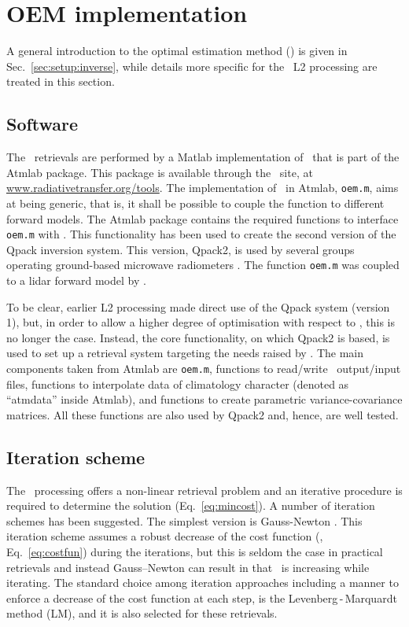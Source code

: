 \chapter{OEM implementation}
\label{chapter:oem}

A general introduction to the optimal estimation method (\OEM) is given in
Sec.~\ref{sec:setup:inverse}, while details more specific for the \smr\ L2
processing are treated in this section.


\section{Software}
\label{sec:oem.m}
%
The \smr\ retrievals are performed by a Matlab implementation of \OEM\ that is
part of the Atmlab package. This package is available through the \ARTS\ site,
at \url{www.radiativetransfer.org/tools}. The implementation of \OEM\ in Atmlab,
\texttt{oem.m}, aims at being generic, that is, it shall be possible to couple
the function to different forward models. The Atmlab package contains the
required functions to interface \texttt{oem.m} with \ARTS. This functionality
has been used to create the second version of the Qpack
\citep{eriksson:qpack:05} inversion system. This version, Qpack2, is used by
several groups operating ground-based microwave radiometers
\citep[e.g.][]{acp-15-5099-2015}. The function \texttt{oem.m} was coupled to a lidar
forward model by \citet{sica2015retrieval}.

To be clear, earlier L2 processing made direct use of the Qpack system (version
1), but, in order to allow a higher degree of optimisation
with respect to \smr, this is no longer the case.
Instead, the core functionality, on which Qpack2 is
based, is used to set up a retrieval system targeting the needs raised by \smr.
The main components taken from Atmlab are \texttt{oem.m}, functions to
read/write \ARTS\ output/input files, functions to interpolate data of
climatology character (denoted as ``atmdata'' inside Atmlab), and functions to
create parametric variance-covariance matrices. All these functions are also
used by Qpack2 and, hence, are well tested.


\section{Iteration scheme}
\label{sec:ml}
%
The \smr\ processing offers a non-linear retrieval problem and an iterative
procedure is required to determine the solution (Eq.~\ref{eq:mincost}). A
number of iteration schemes has been suggested. The simplest version is
Gauss-Newton \citep[see][Sec.~5.3]{rodgers:00}. This iteration scheme assumes a
robust decrease of the cost function (\CstFnc, Eq.~\ref{eq:costfun}) during the
iterations, but this is seldom the case in practical retrievals and instead
Gauss--Newton can result in that \CstFnc\ is increasing while iterating.
The standard choice among iteration approaches including a manner to enforce a
decrease of the cost function at each step, is the Levenberg\,-\,Marquardt
method (LM), and it is also selected for these retrievals.

